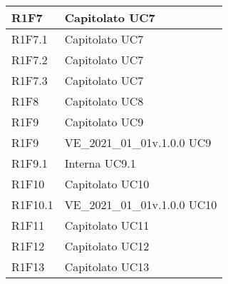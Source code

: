 \begin{center}
\begin{longtable}{|p{22mm}|p{44mm}|}
R1F7 &
Capitolato \newline
UC7 \newline
\\
\hline

R1F7.1 &
Capitolato \newline
UC7 \newline
\\
\hline

R1F7.2 &
Capitolato \newline
UC7 \newline
\\
\hline

R1F7.3 &
Capitolato \newline
UC7 \newline
\\
\hline

R1F8 &
Capitolato \newline
UC8 \newline
\\
\hline

R1F9 &
Capitolato \newline
UC9 \newline
\\
\hline

R1F9 &
VE\_2021\_01\_01v.1.0.0 \newline
UC9 \newline
\\
\hline

R1F9.1 &
Interna \newline
UC9.1 \newline
\\
\hline

R1F10 &
Capitolato \newline
UC10 \newline
\\
\hline

R1F10.1 &
VE\_2021\_01\_01v.1.0.0 \newline
UC10 \newline
\\
\hline

R1F11 &
Capitolato \newline
UC11 \newline
\\
\hline

R1F12 &
Capitolato \newline
UC12 \newline
\\
\hline

R1F13 &
Capitolato \newline
UC13 \newline
\\
\hline


\end{longtable}
\end{center}
